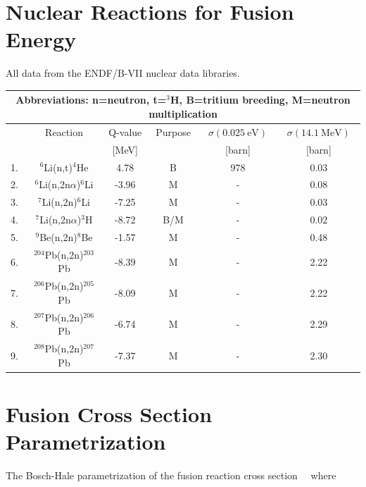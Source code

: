 {\section{Nuclear Reactions for Fusion Energy}
\noindent
All data from the ENDF/B-VII nuclear data libraries.\cite{chadwick}
\begin{table}[h!]\small
  \centering
  \begin{tabular}{l c c c c c}
    \multicolumn{6}{c}{Abbreviations: n=neutron, t=$^3$H, B=tritium breeding, M=neutron multiplication}\\
    \hline
    & Reaction \T\B & Q-value & Purpose & $\sigma(0.025\mathrm{~eV})$ & $\sigma(14.1\mathrm{~MeV})$ \\[5pt]
    &               & [MeV]   &         & [barn]                          & [barn] \\[5pt]
    \hline\hline
    1. \T& $^6$Li(n,t)$^4$He           &  4.78  & B   & 978   & 0.03\\[5pt]
    2.   & $^6$Li(n,2n$\alpha$)$^6$Li  & -3.96  & M   & -     & 0.08\\[5pt]
    3.   & $^7$Li(n,2n)$^6$Li          & -7.25  & M   & -     & 0.03\\[5pt]
    4.   & $^7$Li(n,2n$\alpha$)$^3$H   & -8.72  & B/M & -     & 0.02\\[5pt]
    5.   & $^9$Be(n,2n)$^8$Be          & -1.57  & M   & -     & 0.48\\[5pt]
    6.   & $^{204}$Pb(n,2n)$^{203}$Pb  & -8.39  & M   & -     & 2.22\\[5pt]
    7.   & $^{206}$Pb(n,2n)$^{205}$Pb  & -8.09  & M   & -     & 2.22\\[5pt]
    8.   & $^{207}$Pb(n,2n)$^{206}$Pb  & -6.74  & M   & -     & 2.29\\[5pt]
    9. \B& $^{208}$Pb(n,2n)$^{207}$Pb  & -7.37  & M   & -     & 2.30\\[5pt]
    \hline
  \end{tabular}
  \label{breederReactions}
\end{table}

\vfill

\pagebreak
{}
\section{Fusion Cross Section Parametrization}
The Bosch-Hale parametrization of the fusion reaction cross section~~\cite{bosch}
\indent
where

}
